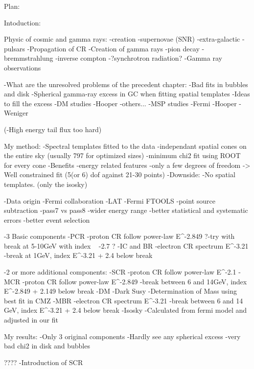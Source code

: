 Plan:

Intoduction:

Physic of cosmic and gamma rays:
	-creation
		-supernovae (SNR)
		-extra-galactic
		-pulsars
	-Propagation of CR
	-Creation of gamma rays
		-pion decay
		-bremmstrahlung
		-inverse compton
		-?synchrotron radiation?
	-Gamma ray observations
		
			
	-What are the unresolved problems of the precedent chapter:
		-Bad fits in bubbles and disk
		-Spherical gamma-ray excess in GC when fitting spatial templates
		-Ideas to fill the excess			
			-DM studies
				-Hooper
				-others...
			-MSP studies
				-Fermi
				-Hooper
				-Weniger

		(-High energy tail flux too hard)

	
	
My method:
	-Spectral templates fitted to the data
		-independant spatial cones on the entire sky (usually 797 for optimized sizes)
		-minimum chi2 fit using ROOT for every cone
		-Benefits
			-energy related features
			-only a few degrees of freedom -> Well constrained fit (5(or 6) dof against 21-30 points)
		-Downside:
			-No spatial templates. (only the isosky)
			
	
	-Data origin
		-Fermi collaboration
		-LAT
		-Fermi FTOOLS
		-point source subtraction
		-pass7 vs pass8
			-wider energy range
			-better statistical and systematic errors
			-better event selection
		

	-3 Basic components
		-PCR
			-proton CR follow power-law E^-2.849
			?-try with break at 5-10GeV with index ~ -2.7 ?
		-IC and BR
			-electron CR spectrum E^-3.21
			-break at 1GeV, index E^-3.21 + 2.4 below break
		
	
	-2 or more additional components:
		-SCR
			-proton CR follow power-law E^-2.1
		-MCR
			-proton CR follow power-law E^-2.849
			-break between 6 and 14GeV, index E^-2.849 + 2.149 below break
		-DM
			-Dark Susy
			-Determination of Mass using best fit in CMZ
		-MBR
			-electron CR spectrum E^-3.21
			-break between 6 and 14 GeV, index E^-3.21 + 2.4 below break
	-Isosky
		-Calculated from fermi model and adjusted in our fit




My results:
	-Only 3 original components
		-Hardly see any spherical excess
		-very bad chi2 in disk and bubbles

????	-Introduction of SCR
	
